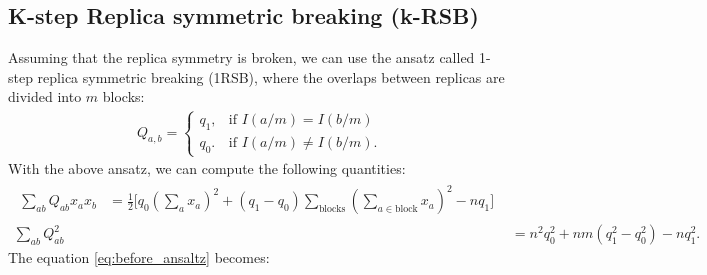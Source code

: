 \documentclass[10pt, notitlepage]{revtex4-2}
\begin{document}
\subsection{K-step Replica symmetric breaking (k-RSB)}
\label{sec:rsb}
Assuming that the replica symmetry is broken, we can use the  ansatz called 1-step replica symmetric breaking (1RSB), where the overlaps between replicas are divided into $m$ blocks:
\begin{eqnarray}
    Q_{a,b}=\begin{cases}
			q_1, & \text{if } I(a/m)=I(b/m) \\
            q_0. & \text{if } I(a/m) \neq I(b/m).
		 \end{cases}
\end{eqnarray}
With the above ansatz, we can compute the following quantities:
\begin{align}
\begin{split}
    \sum_{ab} Q_{ab} x_{a} x_{b}  &  = \frac{1}{2} \bigg[ q_0 \left( \sum_{a}x_a\right)^2 +  (q_1-q_0) \sum_{\text{blocks}}  \left( \sum_{a \in \text{block}}x_a\right)^2   - nq_1\bigg] 
\end{split}
\\
\sum_{ab} Q_{ab}^2 & =  n^2 q_0^2 + nm(q_1^2 - q_0^2) -n q_1^2.
\end{align}
The equation \ref{eq:before_ansaltz} becomes:
\end{document}
